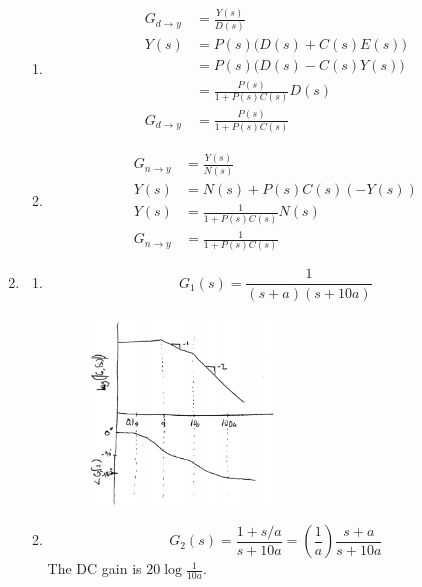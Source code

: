 \documentclass[11pt]{article}
\theoremstyle{definition}
\begin{document}
\begin{enumerate}
\begin{enumerate}
        \item
        \begin{align*}
            G_{d \rightarrow y} &= \frac{Y(s)}{D(s)} \\
            Y(s) &= P(s) \big( D(s) + C(s)E(s) \big) \\
            &= P(s) \big( D(s) - C(s)Y(s) \big) \\
            &= \frac{P(s)}{1 + P(s)C(s)} D(s) \\
            G_{d \rightarrow y} &= \frac{P(s)}{1 + P(s)C(s)}
        \end{align*} 

        \item
        \begin{align*}
            G_{n \rightarrow y} &= \frac{Y(s)}{N(s)} \\
            Y(s) &= N(s) + P(s)C(s)(-Y(s)) \\
            Y(s) &= \frac{1}{1 + P(s)C(s)}N(s) \\
            G_{n \rightarrow y} &= \frac{1}{1 + P(s)C(s)}
        \end{align*} 
    \end{enumerate}
    \item %
        \begin{enumerate}
            \item %
            $$ G_1(s) = \frac{1}{(s + a)(s + 10a)} $$
            \begin{figure}[H]
                \centering
                \includegraphics[width = 0.5\textwidth]{ES155P7_2a}
            \end{figure}
            \item %
            $$ G_2(s) = \frac{1 + s/a}{s + 10a} = \left(\frac{1}{a}\right)\frac{s + a}{s + 10a} $$
            The DC gain is $20\log \frac{1}{10 a}$.
            \begin{figure}[H]

\end{figure}
\end{enumerate}
\end{enumerate}
\end{document}
